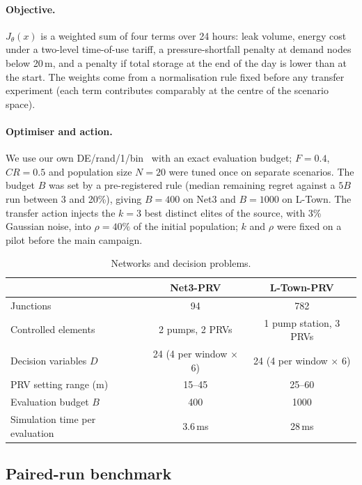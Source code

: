 \documentclass[11pt]{article}
\begin{document}
\paragraph{Objective.} $J_\theta(x)$ is a weighted sum of four terms over 24 hours: leak volume, energy cost under a
two-level time-of-use tariff, a pressure-shortfall penalty at demand nodes below 20\,m, and a penalty if total storage
at the end of the day is lower than at the start. The weights come from a normalisation rule fixed before any
transfer experiment (each term contributes comparably at the centre of the scenario space).

\paragraph{Optimiser and action.} We use our own DE/rand/1/bin~\citep{storn1997de} with an exact
evaluation budget; $F=0.4$, $CR=0.5$ and population size $N=20$ were tuned once on separate scenarios. The budget
$B$ was set by a pre-registered rule (median remaining regret against a $5B$ run between 3 and 20\%), giving $B=400$
on Net3 and $B=1000$ on L-Town. The transfer action injects the $k=3$ best distinct elites of the source, with 3\%
Gaussian noise, into $\rho=40\%$ of the initial population; $k$ and $\rho$ were fixed on a pilot before the main
campaign.

\begin{table}[t]
\centering\small
\caption{Networks and decision problems.}\label{tab:networks}
\begin{tabular}{@{}lcc@{}}
\toprule
 & Net3-PRV & L-Town-PRV \\
\midrule
Junctions & 94 & 782 \\
Controlled elements & 2 pumps, 2 PRVs & 1 pump station, 3 PRVs \\
Decision variables $D$ & 24 (4 per window $\times$ 6) & 24 (4 per window $\times$ 6) \\
PRV setting range (m) & 15--45 & 25--60 \\
Evaluation budget $B$ & 400 & 1000 \\
Simulation time per evaluation & 3.6\,ms & 28\,ms \\
\bottomrule
\end{tabular}
\end{table}

\subsection{Paired-run benchmark}
\end{document}

